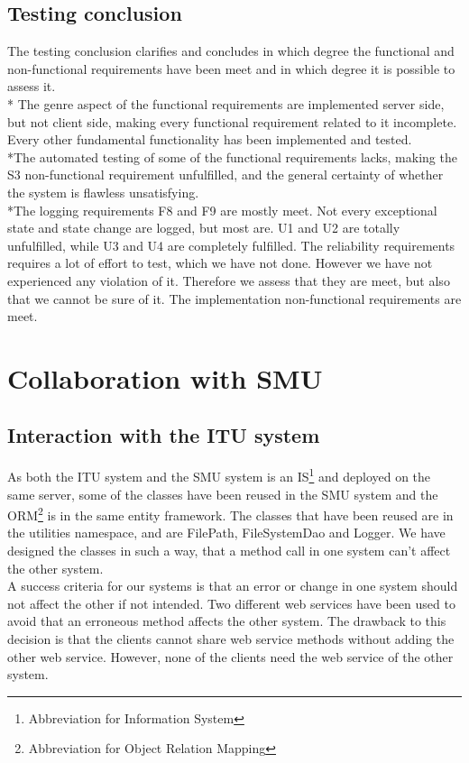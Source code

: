 \documentclass[a4paper,11pt,report]{article}
\begin{document}
{\subsection{Testing conclusion}
The testing conclusion clarifies and concludes in which degree the functional and non-functional requirements have been meet and in which degree it is possible to assess it. \\*
The genre aspect of the functional requirements are implemented server side, but not client side, making every functional requirement related to it incomplete. Every other fundamental functionality has been implemented and tested. \\*The automated testing of some of the functional requirements lacks, making the S3 non-functional requirement unfulfilled, and the general certainty of whether the system is flawless unsatisfying.\\*The logging requirements F8 and F9 are mostly meet. Not every exceptional state and state change are logged, but most are. U1 and U2 are totally unfulfilled, while U3 and U4 are completely fulfilled. The reliability requirements requires a lot of effort to test, which we have not done. However we have not experienced any violation of it. Therefore we assess that they are meet, but also that we cannot be sure of it. The implementation non-functional requirements are meet.

\section{Collaboration with SMU}

\subsection{Interaction with the ITU system}
As both the ITU system and the SMU system is an IS\footnote[2]{Abbreviation for Information System} and deployed on the same server, some of the classes have been reused in the SMU system and the ORM\footnote[3]{Abbreviation for Object Relation Mapping} is in the same entity framework.
The classes that have been reused are in the utilities namespace, and are FilePath, FileSystemDao and Logger. We have designed the classes in such a way, that a method call in one system can't affect the other system. \\
A success criteria for our systems is that an error or change in one system should not affect the other if not intended. Two different web services have been used to avoid that an erroneous method affects the other system.
The drawback to this decision is that the clients cannot share web service methods without adding the other web service. However, none of the clients need the web service of the other system. 

}
\end{document}
